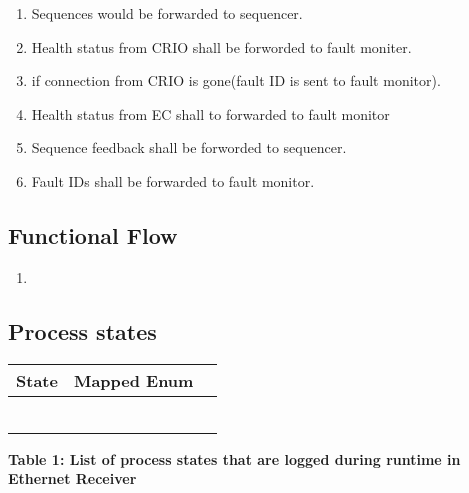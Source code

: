 \begin{enumerate}
	\item Sequences would be forwarded to sequencer.
	\item Health status from CRIO shall be forworded to fault moniter.
	\item if connection from CRIO is gone(fault ID is sent to fault monitor).
	\item Health status from EC shall to forwarded to fault monitor
	\item Sequence feedback shall be forworded to sequencer.
	\item Fault IDs shall be forwarded to fault monitor.
	
\end{enumerate}

\subsection{Functional Flow}

\begin{enumerate}
	\item
	
\end{enumerate}

\subsection{Process states}

\begin{table}[h!]
	\begin{center}
		\begin{tabular}{|p{3 cm}|p{5 cm}|p{5 cm}|}
			\hline
			\textbf{State} & \textbf{Mapped Enum} \\
			\hline
			&  \\
			\hline
			&  \\
			\hline
			&  \\
			\hline
			&  \\
			\hline
			&  \\
			\hline
			&  \\
			\hline
		\end{tabular}
		\begin{center}
			\textbf{Table 1: List of process states that are logged during runtime in Ethernet Receiver }
		\end{center}
	\end{center}
\end{table}

